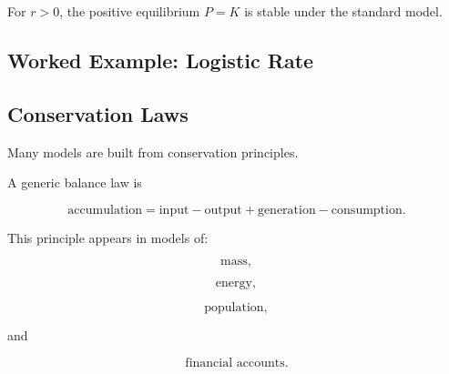 For \(r>0\), the positive equilibrium \(P=K\) is stable under the standard
model.

\subsection{Worked Example: Logistic Rate}
\label{subsec:worked-logistic-rate}


\subsection{Conservation Laws}
\label{subsec:modeling-conservation-laws}

Many models are built from conservation principles.

A generic balance law is

\[
\boxed{
\text{accumulation}
=
\text{input}
-
\text{output}
+
\text{generation}
-
\text{consumption}.
}
\]

This principle appears in models of:

\[
\boxed{
\text{mass},
}
\]

\[
\boxed{
\text{energy},
}
\]

\[
\boxed{
\text{population},
}
\]

and

\[
\boxed{
\text{financial accounts}.
}
\]

